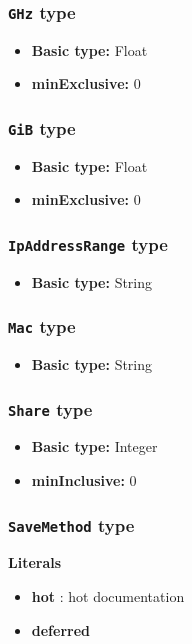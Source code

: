 \subsubsection{\texttt{GHz} type}

\begin{itemize}
\item \textbf{Basic type:} Float
	\item \textbf{minExclusive:} 0
\end{itemize}
\subsubsection{\texttt{GiB} type}

\begin{itemize}
\item \textbf{Basic type:} Float
	\item \textbf{minExclusive:} 0
\end{itemize}
\subsubsection{\texttt{IpAddressRange} type}

\begin{itemize}
\item \textbf{Basic type:} String
\end{itemize}
\subsubsection{\texttt{Mac} type}

\begin{itemize}
\item \textbf{Basic type:} String
\end{itemize}
\subsubsection{\texttt{Share} type}

\begin{itemize}
\item \textbf{Basic type:} Integer
	\item \textbf{minInclusive:} 0
\end{itemize}
\subsubsection{\texttt{SaveMethod} type}

\textbf{Literals}
\begin{itemize}
\item \textbf{hot}   : hot documentation
\end{itemize}
\begin{itemize}
\item \textbf{deferred} 
\end{itemize}

